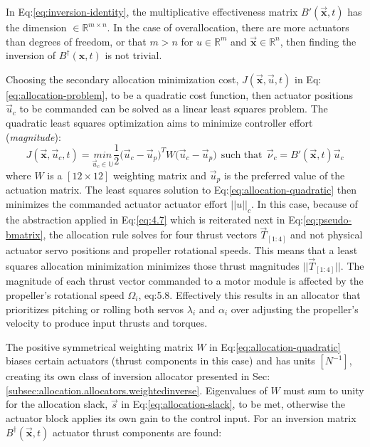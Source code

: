 In Eq:\ref{eq:inversion-identity}, the multiplicative effectiveness matrix $B'(\vec{\mathbf{x}},t)$ has the dimension $\in\mathbb{R}^{m\times n}$. In the case of overallocation, there are more actuators than degrees of freedom, or that $m>n$ for $u\in\mathbb{R}^{m}$ and $\vec{\mathbf{x}}\in\mathbb{R}^{n}$, then finding the inversion of $B^\dagger(\mathbf{x},t)$ is not trivial. 
\par
Choosing the secondary allocation minimization cost, $J(\vec{\mathbf{x}},\vec{u},t)$ in Eq:\ref{eq:allocation-problem}, to be a quadratic cost function, then actuator positions $\vec{u}_c$ to be commanded can be solved as a linear least squares problem. The quadratic least squares optimization aims to minimize controller effort (\emph{magnitude}):
\begin{equation}\label{eq:allocation-quadratic}
J(\vec{\mathbf{x}},\vec{u}_c,t)=\underset{\vec{u}_c\in\mathbb{U}}{min}\frac{1}{2}\big(\vec{u}_c-\vec{u}_p\big)^TW\big(\vec{u}_c-\vec{u}_p)~~\text{such that}~~\vec{\nu}_c=B'(\vec{\mathbf{x}},t)\vec{u}_c
\end{equation}
where $W$ is a $[12\times 12]$ weighting matrix and $\vec{u}_p$ is the preferred value of the actuation matrix. The least squares solution \cite{matrixcomputations} to Eq:\ref{eq:allocation-quadratic} then minimizes the commanded actuator actuator effort $||u||_c$. In this case, because of the abstraction applied in Eq:\ref{eq:4.7} which is reiterated next in Eq:\ref{eq:pseudo-bmatrix}, the allocation rule solves for four thrust vectors $\vec{T}_{[1:4]}$ and not physical actuator servo positions and propeller rotational speeds. This means that a least squares allocation minimization minimizes those thrust magnitudes $||\vec{T}_{[1:4]}||$. The magnitude of each thrust vector commanded to a motor module is affected by the propeller's rotational speed $\Omega_i$, {eq:5.8}. Effectively this results in an allocator that prioritizes pitching or rolling both servos $\lambda_i$ and $\alpha_i$ over adjusting the propeller's velocity to produce input thrusts and torques. 
\par
The positive symmetrical weighting matrix $W$ in Eq:\ref{eq:allocation-quadratic} biases certain actuators (thrust components in this case) and has units $[N^{-1}]$, creating its own class of inversion allocator presented in Sec:\ref{subsec:allocation.allocators.weightedinverse}. Eigenvalues of $W$ must sum to unity for the allocation slack, $\vec{s}$ in Eq:\ref{eq:allocation-slack}, to be met, otherwise the actuator block applies its own gain to the control input. For an inversion matrix $B^\dagger(\vec{\mathbf{x}},t)$ actuator thrust components are found:

